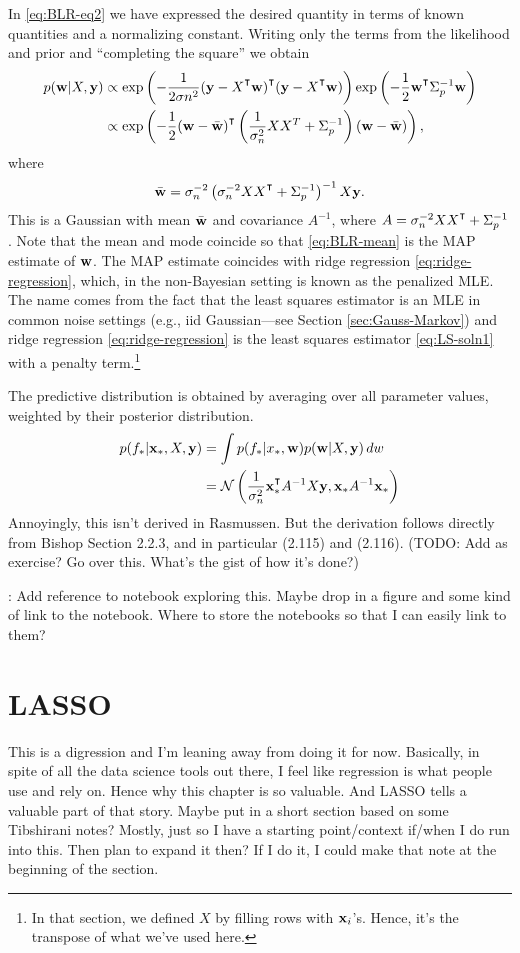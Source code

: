 In \eqref{eq:BLR-eq2} we have expressed the desired quantity in terms of known quantities and a normalizing constant. Writing only the terms from the likelihood and prior and ``completing the square'' we obtain
\begin{align}
p(\w|X, \y) & \propto \exp\left( -\frac{1}{2\sigma n^2}(\y - X^\T\w)^\T(\y - X^\T\w) \right) \exp\left( -\frac{1}{2}\w^\T \Sigma_p^{-1} \w \right)\\
& \propto \exp\left( -\frac{1}{2}(\w - \bar \w)^\T \left( \frac{1}{\sigma_n^2}XX^T + \Sigma_p^{-1} \right) (\w - \bar \w) \right),
\end{align}
where 
\begin{equation} \label{eq:BLR-mean}
\bar \w = \sigma_n^{-2}\left(\sigma_n^{-2} X X^\T + \Sigma_p^{-1} \right)^{-1} X\y. 
\end{equation}
This is a Gaussian with mean $\bar {{ \bf w}}$ and covariance $A^{-1}$, where $A = \sigma_n^{-2}X X^\T + \Sigma_p^{-1}$. Note that the mean and mode coincide so that \eqref{eq:BLR-mean} is the MAP estimate of ${ \bf w}$. The MAP estimate coincides with ridge regression \eqref{eq:ridge-regression}, which, in the non-Bayesian setting is known as the penalized MLE. The name comes from the fact that the least squares estimator is an MLE in common noise settings (e.g., iid Gaussian---see Section \ref{sec:Gauss-Markov}) and ridge regression \eqref{eq:ridge-regression} is the least squares estimator \eqref{eq:LS-soln1} with a penalty term.\footnote{In that section, we defined $X$ by filling rows with ${ \bf x}_i$'s. Hence, it's the transpose of what we've used here.} 

The predictive distribution is obtained by averaging over all parameter values, weighted by their posterior distribution. 
\begin{align}
p(f_*|\x_*, X, \y) & = \int p(f_*|x_*, \w) p(\w|X, \y)\dw \\
& = \calN\left(\frac{1}{\sigma_n^2} \x_*^\T A^{-1}X\y, \x_*A^{-1} \x_*\right)
\end{align}
Annoyingly, this isn't derived in Rasmussen. But the derivation follows directly from Bishop Section 2.2.3, and in particular (2.115) and (2.116). (TODO: Add as exercise? Go over this. What's the gist of how it's done?)

: Add reference to notebook exploring this. Maybe drop in a figure and some kind of link to the notebook. Where to store the notebooks so that I can easily link to them? 

\section{LASSO}
 This is a digression and I'm leaning away from doing it for now. Basically, in spite of all the data science tools out there, I feel like regression is what people use and rely on. Hence why this chapter is so valuable. And LASSO tells a valuable part of that story. Maybe put in a short section based on some Tibshirani notes? Mostly, just so I have a starting point/context if/when I do run into this. Then plan to expand it then? If I do it, I could make that note at the beginning of the section. 